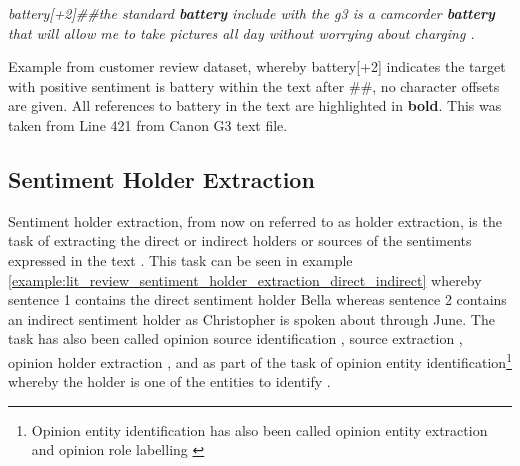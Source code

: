 \begin{example}
\textit{battery[+2]\#\#the standard \textbf{battery} include with the g3 is a camcorder \textbf{battery} that will allow me to take pictures all day without worrying about charging .}
\caption{Example from customer review dataset, whereby battery[+2] indicates the target with positive sentiment is battery within the text after \#\#, no character offsets are given. All references to battery in the text are highlighted in \textbf{bold}. This was taken from Line 421 from Canon G3 text file.}
\label{example:lit_review_target_extraction_customer_review_problem}
\end{example}



\subsection{Sentiment Holder Extraction}
Sentiment holder extraction, from now on referred to as holder extraction, is the task of extracting the direct or indirect holders or sources of the sentiments expressed in the text \citep{choi-etal-2005-identifying}. This task can be seen in example \ref{example:lit_review_sentiment_holder_extraction_direct_indirect} whereby sentence 1 contains the direct sentiment holder Bella whereas sentence 2 contains an indirect sentiment holder as Christopher is spoken about through June. The task has also been called opinion source identification \citep{choi-etal-2005-identifying}, source extraction \citep{choi-etal-2006-joint}, opinion holder extraction \citep{johansson-moschitti-2010-reranking, wiegand-klakow-2012-generalization}, and as part of the task of opinion entity identification\footnote{Opinion entity identification has also been called opinion entity extraction \citep{katiyar-cardie-2016-investigating} and opinion role labelling \citep{marasovic-frank-2018-srl4orl, zhang-etal-2019-enhancing}} whereby the holder is one of the entities to identify \citep{yang-cardie-2013-joint}.

